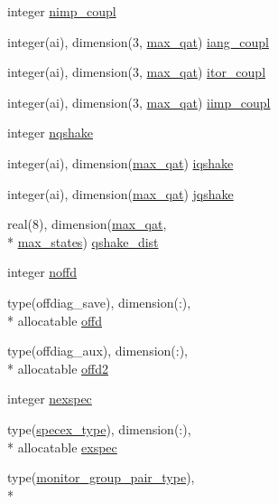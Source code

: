 \begin{DoxyCompactItemize}
integer \hyperlink{classqatom_a4afd5a33301007292bca9293ee2df063}{nimp\-\_\-coupl}
\item 
integer(ai), dimension(3, \hyperlink{classqatom_aed28407cee717496e5e81de3a1768577}{max\-\_\-qat}) \hyperlink{classqatom_ab5f70e89148ed3cbe2685d0e324e4dc7}{iang\-\_\-coupl}
\item 
integer(ai), dimension(3, \hyperlink{classqatom_aed28407cee717496e5e81de3a1768577}{max\-\_\-qat}) \hyperlink{classqatom_a155b1e58a34b7c1d1757b9db290dd60b}{itor\-\_\-coupl}
\item 
integer(ai), dimension(3, \hyperlink{classqatom_aed28407cee717496e5e81de3a1768577}{max\-\_\-qat}) \hyperlink{classqatom_ac136119a98cb2d0bc7bbaec7becef89f}{iimp\-\_\-coupl}
\item 
integer \hyperlink{classqatom_a358d1217d3ef3822b8631ba69079912d}{nqshake}
\item 
integer(ai), dimension(\hyperlink{classqatom_aed28407cee717496e5e81de3a1768577}{max\-\_\-qat}) \hyperlink{classqatom_a45d0fea31b19ee37b386b811bb6ebfc7}{iqshake}
\item 
integer(ai), dimension(\hyperlink{classqatom_aed28407cee717496e5e81de3a1768577}{max\-\_\-qat}) \hyperlink{classqatom_a4f1103b4b5324b7f4f1e5fc06365984a}{jqshake}
\item 
real(8), dimension(\hyperlink{classqatom_aed28407cee717496e5e81de3a1768577}{max\-\_\-qat}, \\*
\hyperlink{classqatom_ad89179e7bcdef29e13211330d1b8fd20}{max\-\_\-states}) \hyperlink{classqatom_aa4f7d5fe66a06eedb3c584c3c4d0d43c}{qshake\-\_\-dist}
\item 
integer \hyperlink{classqatom_a87bc07bd4a86830062583403e3438dfa}{noffd}
\item 
type(offdiag\-\_\-save), dimension(\-:), \\*
allocatable \hyperlink{classqatom_a9cb55eb282cdfb465aafddab998a1669}{offd}
\item 
type(offdiag\-\_\-aux), dimension(\-:), \\*
allocatable \hyperlink{classqatom_ab508173c538653aec2949bedb6858896}{offd2}
\item 
integer \hyperlink{classqatom_ad23eb0f3674a085828b3536f2d2d0129}{nexspec}
\item 
type(\hyperlink{structqatom_1_1specex__type}{specex\-\_\-type}), dimension(\-:), \\*
allocatable \hyperlink{classqatom_a8056cd41f167e8804510eb741ab0228d}{exspec}
\item 
type(\hyperlink{structqatom_1_1monitor__group__pair__type}{monitor\-\_\-group\-\_\-pair\-\_\-type}), \\*

\end{DoxyCompactItemize}
